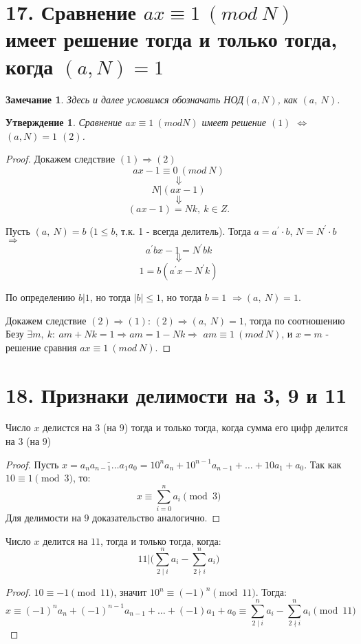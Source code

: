 \documentclass[a4paper,12pt]{article}
\newtheorem*{Note}{Замечание}
\newtheorem*{state}{Утверждение}
\newcommand{\p}{^{\prime}}
\begin{document}
	\section*{17. Сравнение $ax \equiv 1\ (mod\ N)$ имеет решение тогда и только тогда, когда $(a, N) = 1$}
		\begin{Note} Здесь и далее условимся обозначать НОД$(a, N)$, как $(a,\ N)$.
		\end{Note}
		\begin{state}
		Сравнение $ax \equiv 1\ (mod N)$ имеет решение $(1)$ $\Leftrightarrow$ $(a, N) = 1$ $(2)$. 
		\end{state}
		\begin{proof}
		Докажем следствие $(1) \Rightarrow (2)$
		$$ax - 1\equiv 0\ (mod\ N)$$ 
		$$\Downarrow$$ 
		$$N | (ax - 1)$$
		$$\Downarrow$$ 
		$$(ax - 1) = Nk,\ k \in Z.$$

		Пусть $(a,\ N) = b$ ($1 \leqslant b$, т.к. 1 - всегда делитель).
		Тогда $a = a\p \cdot b$, $N = N\p \cdot b$ $\Rightarrow$
		$$a\p bx - 1 = N\p bk$$
		$$\Downarrow$$
		$$1 = b(a\p x - N\p k)$$

		По определению $b|1$, но тогда $|b| \leqslant 1$, но тогда $b = 1$ $\Rightarrow$$(a,\ N) = 1$.

		Докажем следствие $(2) \Rightarrow (1)$: $(2) \Rightarrow (a,\ N) = 1$, тогда по соотношению Безу $\exists m,\ k:\ am + Nk = 1 \Rightarrow am = 1 - Nk \Rightarrow$ $am \equiv 1\ (mod\ N)$, и $x=m$ - решение сравния $ax \equiv 1\ (mod\ N)$.  
		\end{proof}

		\section*{18. Признаки делимости на 3, 9 и 11}

        Число $x$ делистся на $3$ (на $9$) тогда и только тогда, когда сумма его цифр делится на $3$ (на $9$)
        \begin{proof}
            Пусть $x = \overline{a_{n}a_{n - 1}\ldots a_{1}a_{0}} = 10^{n}a_{n} + 10^{n - 1}a_{n - 1} + \ldots + 10a_{1} + a_{0}$. Так как\\
            $10 \equiv 1 \pmod 3$, то:
            \[
                x \equiv \sum_{i = 0}^{n} a_{i} \pmod 3
            \]
            Для делимости на $9$ доказательство аналогично.
        \end{proof}
        Число $x$ делится на $11$, тогда и только тогда, когда:
        \[
        	11 | \bigg(\sum_{2 \mid i}^{n} a_{i} - \sum_{2 \nmid i}^{n} a_{i}\bigg)
        \]
        \begin{proof}
        	$10 \equiv -1 \pmod{11}$, значит $10^{n} \equiv (-1)^{n} \pmod{11}$. Тогда:
        	\[
        		x \equiv (-1)^{n}a_{n} + (-1)^{n - 1}a_{n - 1} + \ldots + (-1)a_{1} + a_{0} \equiv \sum_{2 \mid i}^{n} a_{i} - \sum_{2 \nmid i}^{n} a_{i} \pmod{11}
        	\]
        \end{proof}
\end{document}
